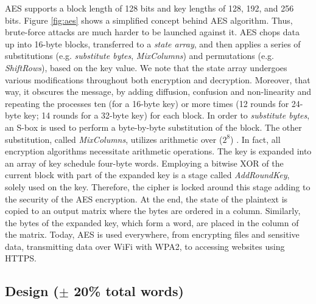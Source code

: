 AES supports a block length of 128 bits and key lengths of 128, 192, and 256 bits. Figure \ref{fig:aes} shows a simplified concept behind AES algorithm. Thus, brute-force attacks are much harder to be launched against it. AES chops data up into 16-byte blocks, transferred to a \emph{state array}, and then applies a series of substitutions (e.g. \emph{substitute bytes}, \emph{MixColumns}) and permutations (e.g. \emph{ShiftRows}), based on the key value. We note that the state array undergoes various modifications throughout both encryption and decryption. Moreover, that way, it obscures the message, by adding diffusion, confusion and non-linearity and repeating the processes ten (for a 16-byte key) or more times (12 rounds for 24-byte key; 14 rounds for a 32-byte key) for each block. In order to \emph{substitute bytes}, an S-box is used to perform a byte-by-byte substitution of the block. The other substitution, called \emph{MixColumns}, utilizes arithmetic over ($2^{8}$) \cite{stallings2017-a}. In fact, all encryption algorithms necessitate arithmetic operations. The key is expanded into an array of key schedule four-byte words. Employing a bitwise XOR of the current block with part of the expanded key is a stage called \emph{AddRoundKey}, solely used on the key. Therefore, the cipher is locked around this stage adding to the security of the AES encryption.  At the end, the state of the plaintext is copied to an output matrix where the bytes are ordered in a column. Similarly, the bytes of the expanded key, which form a word, are placed in the column of the matrix. Today, AES is used everywhere, from encrypting files and sensitive data, transmitting data over WiFi with WPA2, to accessing websites using HTTPS. 

\subsection{Design ($\pm$ 20\% total words)}

